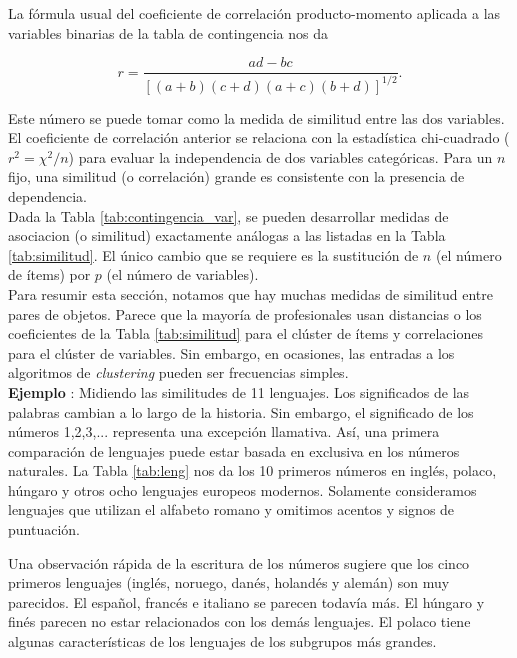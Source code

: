 \documentclass[a4paper, 20pt]{article}
\newcounter{EJCounter}
\newcommand{\ej}[1]{\refstepcounter{EJCounter}\textbf{\rmfamily Ejemplo \theEJCounter}\label{#1}}
\begin{document}
La fórmula usual del coeficiente de correlación producto-momento aplicada a las variables binarias de la tabla de contingencia nos da

$$r = \frac{ad-bc}{[(a+b)(c+d)(a+c)(b+d)]^{1/2}}.$$

Este número se puede tomar como la medida de similitud entre las dos variables.\\

El coeficiente de correlación anterior se relaciona con la estadística chi-cuadrado ($r^2=\chi^2/n$) para evaluar la independencia de dos variables categóricas. Para un $n$ fijo, una similitud (o correlación) grande es consistente con la presencia de dependencia.\\

Dada la Tabla \ref{tab:contingencia_var}, se pueden desarrollar medidas de asociacion (o similitud) exactamente análogas a las listadas en la Tabla \ref{tab:similitud}. El único cambio que se requiere es la sustitución de $n$ (el número de ítems) por $p$ (el número de variables).\\

Para resumir esta sección, notamos que hay muchas medidas de similitud entre pares de objetos. Parece que la mayoría de profesionales usan distancias o los coeficientes de la Tabla \ref{tab:similitud} para el clúster de ítems y correlaciones para el clúster de variables. Sin embargo, en ocasiones, las entradas a los algoritmos de \textit{clustering} pueden ser frecuencias simples.\\

\ej{ej:leng}: Midiendo las similitudes de 11 lenguajes. Los significados de las palabras cambian a lo largo de la historia. Sin embargo, el significado de los números 1,2,3,... representa una excepción llamativa. Así, una primera comparación de lenguajes puede estar basada en exclusiva en los números naturales. La Tabla \ref{tab:leng}  nos da los 10 primeros números en inglés, polaco, húngaro y otros ocho lenguajes europeos modernos. Solamente consideramos lenguajes que utilizan el alfabeto romano y omitimos acentos y signos de puntuación.

Una observación rápida de la escritura de los números sugiere que los cinco primeros lenguajes (inglés, noruego, danés, holandés y alemán) son muy parecidos. El español, francés e italiano se parecen todavía más. El húngaro y finés parecen no estar relacionados con los demás lenguajes. El polaco tiene algunas características de los lenguajes de los subgrupos más grandes.
\end{document}
